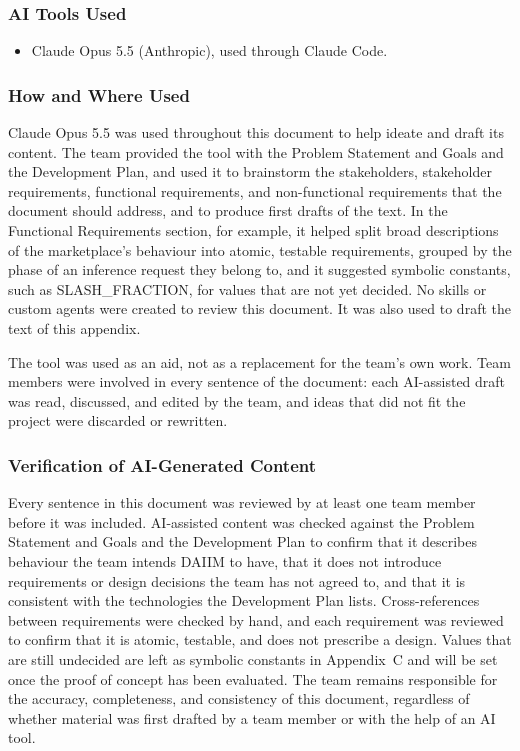 \documentclass[12pt]{article}
\begin{document}
\subsubsection*{AI Tools Used}

\begin{itemize}
    \item Claude Opus 5.5 (Anthropic), used through Claude Code.
\end{itemize}

\subsubsection*{How and Where Used}

Claude Opus 5.5 was used throughout this document to help ideate and draft its
content. The team provided the tool with the Problem Statement and Goals and
the Development Plan, and used it to brainstorm the stakeholders, stakeholder
requirements, functional requirements, and non-functional requirements that
the document should address, and to produce first drafts of the text. In the
Functional Requirements section, for example, it helped split broad
descriptions of the marketplace's behaviour into atomic, testable
requirements, grouped by the phase of an inference request they belong to, and
it suggested symbolic constants, such as SLASH\_FRACTION, for values that are
not yet decided. No skills or custom agents were created to review this
document. It was also used to draft the text of this appendix.

The tool was used as an aid, not as a replacement for the team's own work.
Team members were involved in every sentence of the document: each AI-assisted
draft was read, discussed, and edited by the team, and ideas that did not fit
the project were discarded or rewritten.

\subsubsection*{Verification of AI-Generated Content}

Every sentence in this document was reviewed by at least one team member
before it was included. AI-assisted content was checked against the Problem
Statement and Goals and the Development Plan to confirm that it describes
behaviour the team intends DAIIM to have, that it does not introduce
requirements or design decisions the team has not agreed to, and that it is
consistent with the technologies the Development Plan lists. Cross-references
between requirements were checked by hand, and each requirement was reviewed to
confirm that it is atomic, testable, and does not prescribe a design. Values
that are still undecided are left as symbolic constants in
Appendix~C and will be set once the proof of concept has been evaluated. The
team remains responsible for the accuracy, completeness, and consistency of
this document, regardless of whether material was first drafted by a team
member or with the help of an AI tool.
\end{document}
